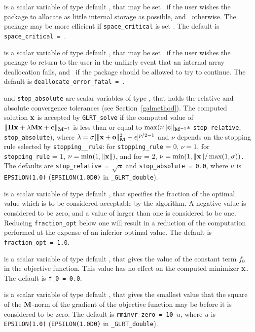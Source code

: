 \documentclass{galahad}
\newcommand{\packagename}{GL\-RT}
\newcommand{\fullpackagename}{\libraryname\_\packagename}
\begin{document}
\begin{description}
 is a scalar variable of type default \logical, that
may be set \true\ if the user wishes the package to allocate as little
internal storage as possible, and \false\ otherwise. The package may
be more efficient if {\tt space\_critical} is set \false.
The default is {\tt space\_critical = \false}.

 is a scalar variable of type default \logical,
that may be set \true\ if the user wishes the package to return to the user
in the unlikely event that an internal array deallocation fails,
and \false\ if the package should be allowed to try to continue.
The default is {\tt deallocate\_error\_fatal = \false}.

 and {\tt stop\_absolute} are scalar variables of type
\realdp, that holds the
relative and absolute convergence tolerances (see Section~\ref{galmethod}).
The computed solution ${\mathbf{x}}$ is accepted by {\tt \packagename\_solve}
if the computed value of
$\|{\mathbf{H}} {\mathbf{x}} + \lambda {\mathbf{M}} {\mathbf{x}} + {\mathbf{c}}\|_{{{\mathbf{M}}^{-1}}} $ is less than or equal
to $\max (\nu \| {\mathbf{c}}\|_{{\mathbf{M}}^{-1}} \ast$ {\tt stop\_relative},
{\tt stop\_absolute}$)$, where $\lambda =
\sigma [ \|{\mathbf{x}}+{\mathbf{o}}\|_{{\mathbf{M}}}^2 + \epsilon]^{p/2-1}$ and $\nu$
depends on the stopping rule selected by %
{\tt stopping\_\_rule}:
for  {\tt stopping\_rule} = 0, $\nu = 1$,
for  {\tt stopping\_rule} = 1, $\nu = \min( 1, \|{\mathbf{x}}\|)$, and
for   = 2,
$\nu = \min( 1, \|{\mathbf{x}}\|/ \max(1,\sigma))$.
The defaults are {\tt stop\_relative = $\sqrt{u}$} and
{\tt stop\_absolute = 0.0},
where $u$ is {\tt EPSILON(1.0)} ({\tt EPSILON(1.0D0)} in
{\tt \fullpackagename\_double}).

 is a scalar variable of type default
\realdp, that specifies the fraction
of the optimal value which is to be considered acceptable by the algorithm.
A negative value is considered to be zero, and a value of larger than one
is considered to be one. Reducing {\tt fraction\_opt} below one will result
in a reduction of the computation performed at the expense of an inferior
optimal value.
The default is {\tt fraction\_opt = 1.0}.

 is a scalar variable of type default
\realdp, that gives the value of the constant term $f_0$ in the
objective function. This value has no effect on the
computed minimizer ${\mathbf{x}}$. The default is {\tt f\_0 = 0.0}.

 is a scalar variable of type default
\realdp, that gives the smallest value that the square of the ${\mathbf{M}}$-norm of
the gradient of the objective function may be before it is considered to be
zero.
The default is {\tt rminvr\_zero = 10 $u$},
where $u$ is {\tt EPSILON(1.0)} ({\tt EPSILON(1.0D0)} in
{\tt \fullpackagename\_double}).


\end{description}
\end{document}
